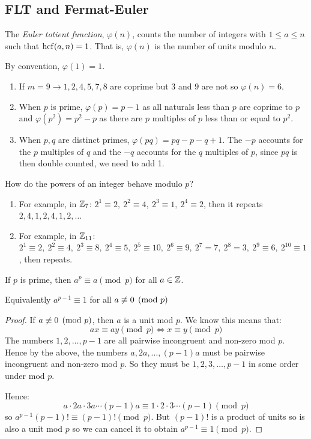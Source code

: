 \documentclass[../main.tex]{subfiles}
\begin{document}
\subsection{FLT and Fermat-Euler}
\begin{definition}
  The \textit{Euler totient function}, $\varphi(n)$, counts the number of integers with $1 \leq a \leq n$ such that $\operatorname{hcf}(a, n) = 1$.
  That is, $\varphi(n)$ is the number of units modulo $n$.

  By convention, $\varphi(1) = 1$.
\end{definition}
\begin{example}
  \begin{enumerate}
    \item  If $m = 9 \to 1, 2, 4, 5, 7, 8$ are coprime but $3$ and $9$ are not so $\varphi(n) = 6$.
    \item When $p$ is prime, $\varphi(p) = p - 1$ as all naturals less than $p$ are coprime to $p$ and $\varphi(p^2) = p^2 - p$ as there are $p$ multiples of $p$ less than or equal to $p^2$.
    \item When $p, q$ are distinct primes, $\varphi(pq) = pq - p - q + 1$.
      The $-p$ accounts for the $p$ multiples of $q$ and the $-q$ accounts for the $q$ multiples of $p$, since $pq$ is then double counted, we need to add 1.
  \end{enumerate}
\end{example}
How do the powers of an integer behave modulo $p$?
\begin{example}
  \begin{enumerate}
    \item For example, in $\mathbb{Z}_7$: $2^{1} \equiv 2,\ 2^{2} \equiv 4,\ 2^{3} \equiv 1,\ 2^{4} \equiv 2$, then it repeats $2, 4, 1, 2, 4, 1, 2, \ldots$
    \item For example, in $\mathbb{Z}_{11}$: $2^{1} \equiv 2,\ 2^{2} \equiv 4,\ 2^{3} \equiv 8,\ 2^{4} \equiv 5,\ 2^{5} \equiv 10,\ 2^{6} \equiv 9,\ 2^{7} = 7,\ 2^{8} = 3,\ 2^{9} \equiv 6,\ 2^{10} \equiv 1$, then repeats.
  \end{enumerate}
\end{example}
\begin{theorem}
  If $p$ is prime, then $a^{p} \equiv a \pmod{p}$ for all $a \in \mathbb{Z}$.

  Equivalently $a^{p - 1} \equiv 1$ for all $a \centernot\equiv 0 \pmod{p}$
  \label{fermatsLittleTheorem}
\end{theorem}
\begin{proof}
  If $a \centernot\equiv 0 \pmod{p}$, then $a$ is a unit mod $p$.
  We know this means that:
  \[
    ax \equiv ay \pmod{p} \iff x \equiv y \pmod{p}
  \]
  The numbers $1, 2, \ldots, p - 1$ are all pairwise incongruent and non-zero mod $p$.
  Hence by the above, the numbers $a, 2a, \ldots, (p-1)a$ must be pairwise incongruent and non-zero mod $p$.
  So they must be $1, 2, 3, \ldots, p - 1$ in some order under mod $p$.

  Hence:
  \[
    a \cdot 2a \cdot 3a \cdots (p-1)a \equiv 1 \cdot 2 \cdot 3 \cdots(p-1) \pmod{p}
  \]
  so $a^{p-1}(p-1)! \equiv (p-1)! \pmod{p}$.
  But $(p - 1)!$ is a product of units so is also a unit mod $p$ so we can cancel it to obtain $a^{p-1} \equiv 1 \pmod{p}$.
\end{proof}
\end{document}
